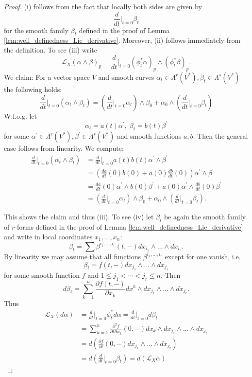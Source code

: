 \begin{proof}
    (i) follows from the fact that locally both sides are given by 
    \[
        \frac{d}{dt}\bigg|_{t=0} \beta_t
    \]
    for the smooth family $\beta_t$ defined in the proof of Lemma \ref{lem:well_definedness_Lie_derivative}. Moreover, (ii) follows immediately from the definition. To see (iii) write
    \[
    \mathcal{L}_X(\alpha \wedge \beta)_p = \frac{d}{dt}\bigg|_{t=0} (\phi_t^\ast\alpha)_p \wedge (\phi_t^\ast\beta)_p.
    \] 
    We claim: For a vector space $V$ and smooth curves $\alpha_t \in \Lambda^r(V^\ast), \beta_t \in \Lambda^s(V^\ast)$ the following holds:
    \[
        \frac{d}{dt}\bigg|_{t=0}(\alpha_t\wedge\beta_t) = \left(\frac{d}{dt}\bigg|_{t=0} \alpha_t\right) \wedge \beta_0 + \alpha_0 \wedge \left(\frac{d}{dt}\bigg|_{t=0} \beta_t\right)
    \]
    W.l.o.g. let 
    \[
    \alpha_t = a(t) \alpha^\prime, \; \beta_t = b(t) \beta^\prime 
    \]
    for some $\alpha^\prime \in \Lambda^r(V^\ast), \beta^\prime \in \Lambda^s(V^\ast)$ and smooth functions $a,b$. Then the general case follows from linearity. We compute:
    \begin{align*}
        \frac{d}{dt}\bigg|_{t=0}(\alpha_t \wedge \beta_t) &= \frac{d}{dt}\bigg|_{t=0} a(t)b(t)\alpha^\prime \wedge \beta^\prime\\
        &= \left( \frac{da}{dt}(0)b(0) + a(0)\frac{db}{dt}(0) \right)\alpha^\prime \wedge \beta^\prime\\
        &=\frac{da}{dt}(0) \alpha^\prime \wedge b(0)\beta^\prime + a(0)\alpha^\prime \wedge \frac{db}{dt}(0)\beta^\prime\\
        &= \left(\frac{d}{dt}\bigg|_{t=0} \alpha_t\right) \wedge \beta_0 + \alpha_0 \wedge \left(\frac{d}{dt}\bigg|_{t=0} \beta_t\right).
    \end{align*}

    This shows the claim and thus (iii). To see (iv) let $\beta_t$ be again the smooth family of $r$-forms defined in the proof of Lemma \ref{lem:well_definedness_Lie_derivative} and write in local coordinates $x_1,\ldots,x_n$:
    \[
    \beta_t = \sum \beta^{i_1,\ldots,i_r}(t,-)dx_{i_1} \wedge \ldots \wedge dx_{i_r}.
    \]
    By linearity we may assume that all functions $\beta^{i_1,\ldots,i_r}$ except for one vanish, i.e.
    \[
    \beta_t = f(t,-)dx_{j_1} \wedge \ldots \wedge dx_{j_r}
    \]
    for some smooth function $f$ and $1 \leq j_1 < \cdots < j_r \leq n$.
    Then
    \[
    d\beta_t = \sum_{k=1}^n \frac{\partial f(t,-)}{\partial x_k} dx^k \wedge dx_{j_1} \wedge \ldots \wedge dx_{j_r}.
    \]
    Thus
    \begin{align*}
        \mathcal{L}_X(d\alpha) &= \frac{d}{dt}\bigg|_{t=0} \phi_t^\ast d\alpha = \frac{d}{dt}\bigg|_{t=0} d\beta_t \\
        &= \sum_{k=1}^n \frac{\partial^2 f}{\partial t\partial x_k}(0,-) dx_k \wedge dx_{j_1} \wedge \ldots \wedge dx_{j_r} \\
        &= d \left(\frac{\partial f}{\partial t}(0,-) dx_{j_1} \wedge \ldots \wedge dx_{j_r}\right) \\
        &= d(\frac{d}{dt}\bigg|_{t=0} \beta_t) = d(\mathcal{L}_X\alpha)
    \end{align*}

\end{proof}

